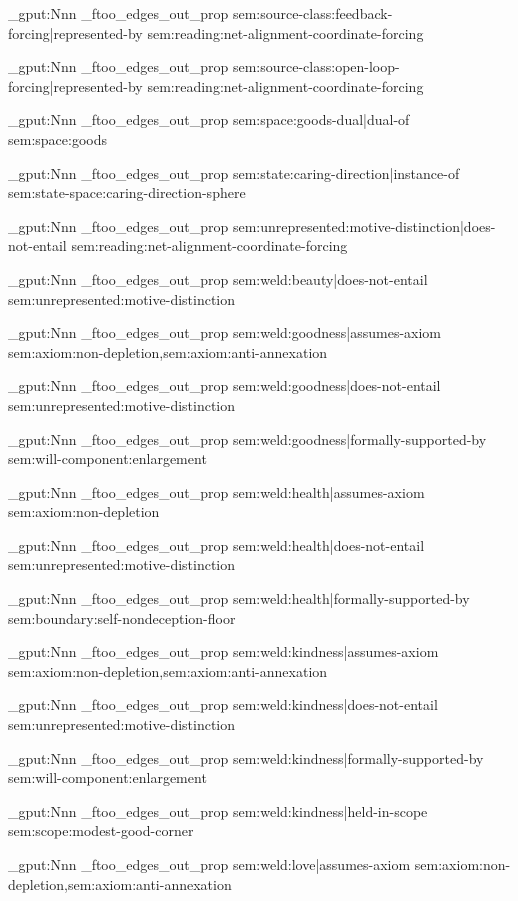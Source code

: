 \prop_gput:Nnn \g_ftoo_edges_out_prop { sem:source-class:feedback-forcing|represented-by } { sem:reading:net-alignment-coordinate-forcing }

\prop_gput:Nnn \g_ftoo_edges_out_prop { sem:source-class:open-loop-forcing|represented-by } { sem:reading:net-alignment-coordinate-forcing }

\prop_gput:Nnn \g_ftoo_edges_out_prop { sem:space:goods-dual|dual-of } { sem:space:goods }

\prop_gput:Nnn \g_ftoo_edges_out_prop { sem:state:caring-direction|instance-of } { sem:state-space:caring-direction-sphere }

\prop_gput:Nnn \g_ftoo_edges_out_prop { sem:unrepresented:motive-distinction|does-not-entail } { sem:reading:net-alignment-coordinate-forcing }

\prop_gput:Nnn \g_ftoo_edges_out_prop { sem:weld:beauty|does-not-entail } { sem:unrepresented:motive-distinction }

\prop_gput:Nnn \g_ftoo_edges_out_prop { sem:weld:goodness|assumes-axiom } { sem:axiom:non-depletion,sem:axiom:anti-annexation }

\prop_gput:Nnn \g_ftoo_edges_out_prop { sem:weld:goodness|does-not-entail } { sem:unrepresented:motive-distinction }

\prop_gput:Nnn \g_ftoo_edges_out_prop { sem:weld:goodness|formally-supported-by } { sem:will-component:enlargement }

\prop_gput:Nnn \g_ftoo_edges_out_prop { sem:weld:health|assumes-axiom } { sem:axiom:non-depletion }

\prop_gput:Nnn \g_ftoo_edges_out_prop { sem:weld:health|does-not-entail } { sem:unrepresented:motive-distinction }

\prop_gput:Nnn \g_ftoo_edges_out_prop { sem:weld:health|formally-supported-by } { sem:boundary:self-nondeception-floor }

\prop_gput:Nnn \g_ftoo_edges_out_prop { sem:weld:kindness|assumes-axiom } { sem:axiom:non-depletion,sem:axiom:anti-annexation }

\prop_gput:Nnn \g_ftoo_edges_out_prop { sem:weld:kindness|does-not-entail } { sem:unrepresented:motive-distinction }

\prop_gput:Nnn \g_ftoo_edges_out_prop { sem:weld:kindness|formally-supported-by } { sem:will-component:enlargement }

\prop_gput:Nnn \g_ftoo_edges_out_prop { sem:weld:kindness|held-in-scope } { sem:scope:modest-good-corner }

\prop_gput:Nnn \g_ftoo_edges_out_prop { sem:weld:love|assumes-axiom } { sem:axiom:non-depletion,sem:axiom:anti-annexation }

